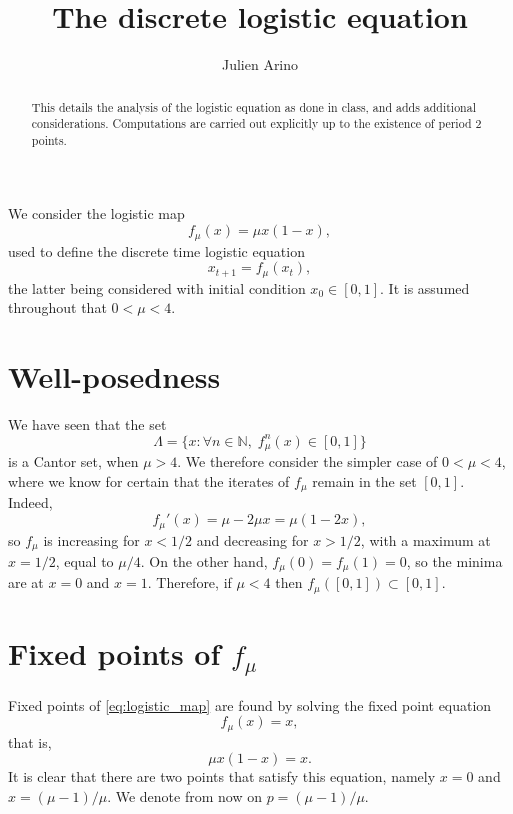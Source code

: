 \documentclass[12pt]{article}
\title{The discrete logistic equation}
\author{Julien Arino}
\theoremstyle{plain}
\def\IN{\mathbb{N}}
\begin{document}
\maketitle

\begin{abstract}
This details the analysis of the logistic equation as done in class, and adds additional considerations. Computations are carried out explicitly up to the existence of period 2 points.
\end{abstract}

We consider the logistic map
\begin{equation}\label{eq:logistic_map}
f_\mu(x)=\mu x(1-x),
\end{equation}
used to define the discrete time logistic equation
\begin{equation}
x_{t+1}=f_\mu(x_t), \label{eq:logistic}
\end{equation}
the latter being considered with initial condition $x_0\in[0,1]$. It is assumed throughout that $0<\mu<4$.

\section{Well-posedness}
We have seen that the set
\[
\Lambda=\{x:\forall n\in\IN,\; f_\mu^n(x)\in[0,1]\}
\]
is a Cantor set, when $\mu>4$. We therefore consider the simpler case of $0<\mu<4$, where we know for certain that the iterates of $f_\mu$ remain in the set $[0,1]$. Indeed, 
\begin{equation}\label{eq:dlogistic_map}
f_\mu'(x)=\mu-2\mu x=\mu(1-2x),
\end{equation}
so $f_\mu$ is increasing for $x<1/2$ and decreasing for $x>1/2$, with a maximum at $x=1/2$, equal to $\mu/4$. On the other hand, $f_\mu(0)=f_\mu(1)=0$, so the minima are at $x=0$ and $x=1$. Therefore, if $\mu<4$ then $f_\mu([0,1])\subset[0,1]$.

\section{Fixed points of $f_\mu$}
Fixed points of \eqref{eq:logistic_map} are found by solving the fixed point equation
\[
f_\mu(x)=x,
\]
that is,
\[
\mu x(1-x)=x.
\]
It is clear that there are two points that satisfy this equation, namely $x=0$ and $x=(\mu-1)/\mu$. We denote from now on $p=(\mu-1)/\mu$.
\end{document}
